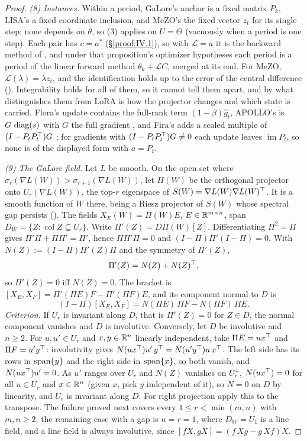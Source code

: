\begin{proof}
\emph{(8) Instances.} Within a period, GaLore's anchor is a fixed matrix $P_k$, LISA's a fixed coordinate inclusion, and
MeZO's the fixed vector $z_t$ for its single step; none depends on $\theta$, so (3) applies on $U=\Theta$ (vacuously when a
period is one step). Each pair has $c=a^*$ (\S\ref{proof:IV.1}), so with $\mathcal L=a$ it is the backward method of
, and under that proposition's optimizer hypotheses each period is a period of the linear forward
method $\theta_k+\mathcal LC$, merged at its end. For MeZO, $\mathcal L(\lambda)=\lambda z_t$, and the identification holds up
to the error of the central difference (). Integrability holds for all of them, so it cannot tell them apart,
and by  what distinguishes them from LoRA is how the projector changes and which state is
carried. Flora's update contains the full-rank term $(1-\beta)\hat g_t$, APOLLO's is $G\,\diag(s)$ with $G$ the full
gradient \citep{zhu2024apollo}, and Fira's adds a scaled multiple of $(I-P_tP_t\T)G$ \citep{chen2024fira}; for gradients with
$(I-P_tP_t\T)G\ne0$ each update leaves $\operatorname{im}P_t$, so none is of the displayed form with $a=P_t$.

\emph{(9) The GaLore field.} Let $L$ be smooth. On the open set where $\sigma_r(\nabla L(W))>\sigma_{r+1}(\nabla L(W))$,
let $\Pi(W)$ be the orthogonal projector onto $U_r(\nabla L(W))$, the top-$r$ eigenspace of $S(W)=\nabla L(W)\nabla L(W)\T$. It
is a smooth function of $W$ there, being a Riesz projector of $S(W)$ whose spectral gap persists (). The fields
$X_E(W)=\Pi(W)E$, $E\in\R^{m\times n}$, span $D_W=\{Z:\operatorname{col}Z\subseteq U_r\}$. Write $\Pi'(Z)=D\Pi(W)[Z]$.
Differentiating $\Pi^2=\Pi$ gives $\Pi'\Pi+\Pi\Pi'=\Pi'$, hence $\Pi\Pi'\Pi=0$ and $(I-\Pi)\Pi'(I-\Pi)=0$. With
$N(Z):=(I-\Pi)\Pi'(Z)\Pi$ and the symmetry of $\Pi'(Z)$,
\begin{equation}\label{eq:C3-proj-deriv}
\Pi'(Z)=N(Z)+N(Z)\T ,
\end{equation}
so $\Pi'(Z)=0$ iff $N(Z)=0$. The bracket is $[X_E,X_F]=\Pi'(\Pi E)F-\Pi'(\Pi F)E$, and its component normal to $D$ is
\[(I-\Pi)[X_E,X_F]=N(\Pi E)\,\Pi F-N(\Pi F)\,\Pi E .\]
\emph{Criterion.} If $U_r$ is invariant along $D$, that is $\Pi'(Z)=0$ for $Z\in D$, the normal component vanishes and $D$ is
involutive. Conversely, let $D$ be involutive and $n\ge2$. For $u,u'\in U_r$ and $x,y\in\R^n$ linearly independent, take
$\Pi E=ux\T$ and $\Pi F=u'y\T$: involutivity gives $N(ux\T)u'\,y\T=N(u'y\T)u\,x\T$. The left side has its rows in
$\spanop\{y\}$ and the right side in $\spanop\{x\}$, so both vanish, and $N(ux\T)u'=0$. As $u'$ ranges over $U_r$ and
$N(Z)$ vanishes on $U_r^\perp$, $N(ux\T)=0$ for all $u\in U_r$ and $x\in\R^n$ (given $x$, pick $y$ independent of it), so
$N=0$ on $D$ by linearity, and $U_r$ is invariant along $D$. For right projection apply this to the transpose. The failure proved next covers every $1\le r<\min(m,n)$
with $m,n\ge2$; the remaining case with a gap is $n=r=1$, where $D_W=U_1$ is a line field, and a line field is always
involutive, since $[fX,gX]=(f\,Xg-g\,Xf)X$.


\end{proof}
